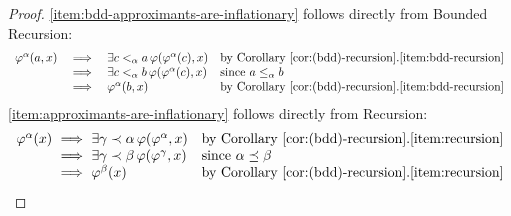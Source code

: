 \documentclass[10pt,a4paper]{amsart}
\theoremstyle{plain}
\theoremstyle{definition}
\renewcommand{\phi}{\varphi}
\newcommand{\anupam}[1]{\todo[color=green]{A: #1}}
\renewcommand{\todo}[1]{}
\renewcommand{\anupam}[1]{}
\theoremstyle{plain}
\theoremstyle{definition} %
\newcommand{\Nat}{\mathbb{N}}
\renewcommand{\land}{\wedge}
\newcommand{\liff}{\leftrightarrow}
\newcommand{\ordleq}{\preceq}
\newcommand{\ordlneq}{\prec}
\begin{document}
\begin{proof}
    \ref{item:bdd-approximants-are-inflationary} follows directly from Bounded Recursion:
    \[
    \begin{array}{rcll}
         \phi^\alpha(a,x) & \implies & \exists c<_\alpha a \, \phi(\phi^\alpha(c),x) & \text{by Corollary~\ref{cor:(bdd)-recursion}.\ref{item:bdd-recursion}}\\
         & \implies & \exists c<_\alpha b\, \phi(\phi^\alpha(c),x) & \text{since $a\leq_\alpha b$}\\
         & \implies &\phi^\alpha(b,x) & \text{by Corollary~\ref{cor:(bdd)-recursion}.\ref{item:bdd-recursion}} 
    \end{array}
    \]
\ref{item:approximants-are-inflationary} follows directly from Recursion:
\[
\begin{array}[b]{r@{\ \implies \ }ll}
     \phi^\alpha(x) & \exists \gamma \ordlneq \alpha \, \phi(\phi^\alpha,x) & \text{by Corollary~\ref{cor:(bdd)-recursion}.\ref{item:recursion}}\\
     & \exists \gamma \ordlneq \beta \, \phi(\phi^\gamma, x) & \text{since $\alpha \ordleq \beta$} \\
     & \phi^\beta(x) & \text{by Corollary~\ref{cor:(bdd)-recursion}.\ref{item:recursion}} 
\end{array}
\]
    \anupam{commented old direct proof below}

\end{proof}
\end{document}

